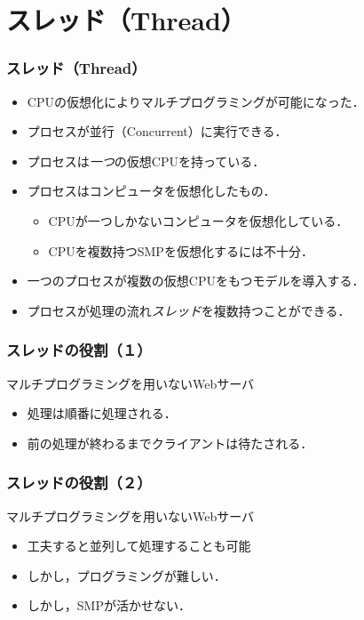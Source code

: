 \documentclass[unicode,handout]{beamer}                   %
\begin{document}
\section{スレッド（Thread）}
\begin{frame}
  \frametitle{スレッド（Thread）}
  \begin{itemize}
    \item CPUの仮想化によりマルチプログラミングが可能になった．
    \item プロセスが並行（Concurrent）に実行できる．
    \item プロセスは\emph{一つ}の仮想CPUを持っている．
    \item プロセスはコンピュータを仮想化したもの．
      \begin{itemize}
      \item CPUが一つしかないコンピュータを仮想化している．
      \item CPUを複数持つSMPを仮想化するには不十分．
      \end{itemize}
    \item 一つのプロセスが複数の仮想CPUをもつモデルを導入する．
    \item プロセスが処理の流れ\emph{スレッド}を複数持つことができる．
  \end{itemize}
  \vfill
\end{frame}

\begin{frame}
  \frametitle{スレッドの役割（１）}
  マルチプログラミングを用いないWebサーバ \\
  \vfill
  \vfill
  \begin{itemize}
  \item 処理は順番に処理される．
  \item 前の処理が終わるまでクライアントは待たされる．
  \end{itemize}
  \vfill
\end{frame}

\begin{frame}
  \frametitle{スレッドの役割（２）}
  マルチプログラミングを用いないWebサーバ \\
  \vfill
  \vfill
  \begin{itemize}
  \item 工夫すると並列して処理することも可能
  \item しかし，プログラミングが難しい．
  \item しかし，SMPが活かせない．
  \end{itemize}
  \vfill
\end{frame}
\end{document}
